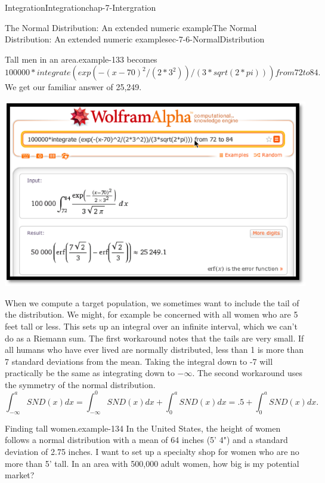\documentclass[oneside,10pt,]{book}
\numberwithin{equation}{section}
\begin{document}
\begin{chapterptx}{Integration}{}{Integration}{}{}{chap-7-Intergration}
\begin{sectionptx}{The Normal Distribution: An extended numeric example}{}{The Normal Distribution: An extended numeric example}{}{}{sec-7-6-NormalDistribution}
\begin{example}{Tall men in an area.}{example-133}
\hypertarget{p-2951}{}%
becomes%
%
\begin{equation*}
{100000*integrate(exp(-(x-70)^2/(2*3^2))/(3*sqrt(2*pi))) from 72 to 84.}
\end{equation*}
\hypertarget{p-2952}{}%
We get our familiar answer of 25,249.%
\begin{sidebyside}{1}{0.2}{0.2}{0}%
\begin{sbspanel}{0.6}%
\includegraphics[width=1\linewidth]{images/sec7-6-6.png}
\end{sbspanel}%
\end{sidebyside}%
\par
\hypertarget{p-2953}{}%
When we compute a target population, we sometimes want to include the tail of the distribution.  We might, for example be concerned with all women who are 5 feet tall or less.  This sets up an integral over an infinite interval, which we can’t do as a Riemann sum.  The first workaround notes that the tails are very small.  If all humans who have ever lived are normally distributed, less than 1 is more than 7 standard deviations from the mean.  Taking the integral down to -7 will practically be the same as integrating down to \(-\infty\).  The second workaround uses the symmetry of the normal distribution.%
%
\begin{equation*}
\int_{-\infty}^a SND(x)dx=\int_{-\infty}^0 SND(x)dx+\int_0^a SND(x)dx=.5+\int_0^a SND(x)dx.
\end{equation*}
\end{example}
\begin{example}{Finding tall women.}{example-134}%
\hypertarget{p-2954}{}%
In the United States, the height of women follows a normal distribution with a mean of 64 inches (5' 4") and a standard deviation of 2.75 inches.  I want to set up a specialty shop for women who are no more than 5' tall.  In an area with 500,000 adult women, how big is my potential market?%

\end{example}
\end{sectionptx}
\end{chapterptx}
\end{document}
